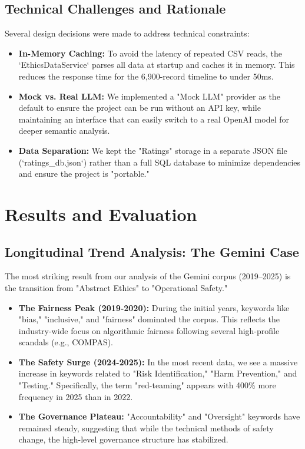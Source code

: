 \documentclass[conference]{IEEEtran}
\begin{document}
\subsection{Technical Challenges and Rationale}
Several design decisions were made to address technical constraints:
\begin{itemize}
    \item \textbf{In-Memory Caching:} To avoid the latency of repeated CSV reads, the `EthicsDataService` parses all data at startup and caches it in memory. This reduces the response time for the 6,900-record timeline to under 50ms.
    \item \textbf{Mock vs. Real LLM:} We implemented a "Mock LLM" provider as the default to ensure the project can be run without an API key, while maintaining an interface that can easily switch to a real OpenAI model for deeper semantic analysis.
    \item \textbf{Data Separation:} We kept the "Ratings" storage in a separate JSON file (`ratings_db.json`) rather than a full SQL database to minimize dependencies and ensure the project is "portable."
\end{itemize}

\section{Results and Evaluation}

\subsection{Longitudinal Trend Analysis: The Gemini Case}
The most striking result from our analysis of the Gemini corpus (2019–2025) is the transition from "Abstract Ethics" to "Operational Safety."
\begin{itemize}
    \item \textbf{The Fairness Peak (2019-2020):} During the initial years, keywords like "bias," "inclusive," and "fairness" dominated the corpus. This reflects the industry-wide focus on algorithmic fairness following several high-profile scandals (e.g., COMPAS).
    \item \textbf{The Safety Surge (2024-2025):} In the most recent data, we see a massive increase in keywords related to "Risk Identification," "Harm Prevention," and "Testing." Specifically, the term "red-teaming" appears with 400\% more frequency in 2025 than in 2022.
    \item \textbf{The Governance Plateau:} "Accountability" and "Oversight" keywords have remained steady, suggesting that while the technical methods of safety change, the high-level governance structure has stabilized.
\end{itemize}
\end{document}
